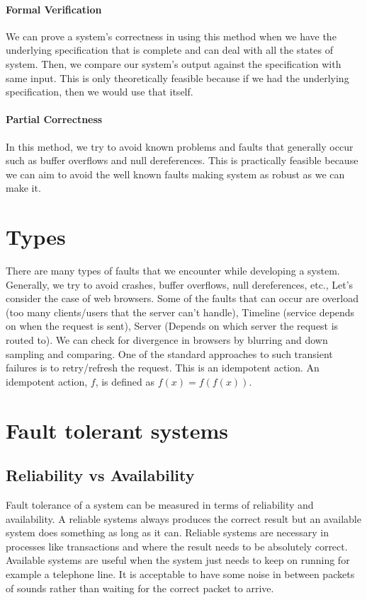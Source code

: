 \documentclass[twoside]{article}
\begin{document}
\paragraph{Formal Verification} We can prove a system's correctness in using this method when we have the underlying specification that is complete and can deal with all the states of system. Then, we compare our system's output against the specification with same input. This is only theoretically feasible because if we had the underlying specification, then we would use that itself.
\paragraph{Partial Correctness} In this method, we try to avoid known problems and faults that generally occur such as buffer overflows and null dereferences. This is practically feasible because we can aim to avoid the well known faults making system as robust as we can make it.
\section{Types}
There are many types of faults that we encounter while developing a system. Generally, we try to avoid crashes, buffer overflows, null dereferences, etc., Let's consider the case of web browsers. Some of the faults that can occur are overload (too many clients/users that the server can't handle), Timeline (service depends on when the request is sent), Server (Depends on which server the request is routed to). We can check for divergence in browsers by blurring and down sampling and comparing. One of the standard approaches to such transient failures is to retry/refresh the request. This is an idempotent action. An idempotent action, $f$, is defined as $f(x) = f(f(x))$.
\section{Fault tolerant systems}
\subsection{Reliability vs Availability} Fault tolerance of a system can be measured in terms of reliability and availability. A reliable systems always produces the correct result but an available system does something as long as it can. Reliable systems are necessary in processes like transactions and where the result needs to be absolutely correct. Available systems are useful when the system just needs to keep on running for example a telephone line. It is acceptable to have some noise in between packets of sounds rather than waiting for the correct packet to arrive.
\end{document}
